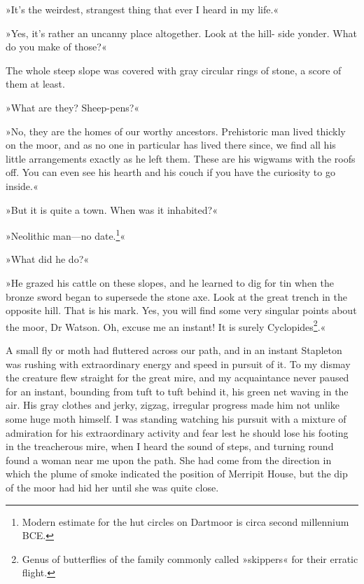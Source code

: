»It's the weirdest, strangest thing that ever I heard in my life.«

»Yes, it's rather an uncanny place altogether. Look at the hill- side yonder. What do you make of those?«

The whole steep slope was covered with gray circular rings of stone, a score of them at least.

»What are they? Sheep-pens?«

»No, they are the homes of our worthy ancestors. Prehistoric man lived thickly on the moor, and as no one in particular has lived there since, we find all his little arrangements exactly as he left them. These are his wigwams with the roofs off. You can even see his hearth and his couch if you have the curiosity to go inside.«

»But it is quite a town. When was it inhabited?«

»Neolithic man\allowbreak---\allowbreak no date.\footnote{Modern estimate for the hut circles on Dartmoor is circa second millennium BCE.}«

»What did he do?«

»He grazed his cattle on these slopes, and he learned to dig for tin when the bronze sword began to supersede the stone axe. Look at the great trench in the opposite hill. That is his mark. Yes, you will find some very singular points about the moor, Dr Watson. Oh, excuse me an instant! It is surely Cyclopides\footnote{Genus of butterflies of the family commonly called »skippers« for their erratic flight.}.«

A small fly or moth had fluttered across our path, and in an instant Stapleton was rushing with extraordinary energy and speed in pursuit of it. To my dismay the creature flew straight for the great mire, and my acquaintance never paused for an instant, \newline bounding from tuft to tuft behind it, his green net waving in the air. His gray clothes and jerky, zigzag, irregular progress made him not unlike some huge moth himself. I was standing watching his pursuit with a mixture of admiration for his extraordinary activity and fear lest he should lose his footing in the treacherous mire, when I heard the sound of steps, and turning round found a woman near me upon the path. She had come from the direction in which the plume of smoke indicated the position of Merripit House, but the dip of the moor had hid her until she was quite close.

